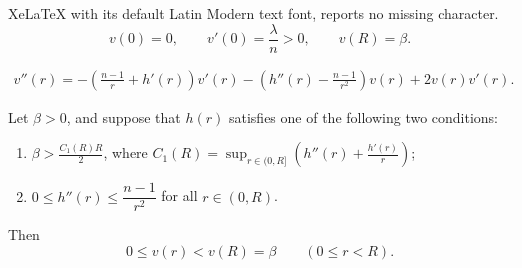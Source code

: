 \documentclass[10pt,a4paper]{amsart}
\begin{document}
XeLaTeX with its default Latin Modern text font, reports no missing character.
\begin{equation}\label{eq:v-origin}
	v(0)=0,\qquad v'(0)=\frac{\lambda}{n}>0,\qquad v(R)=\beta.
\end{equation}

\begin{align}\label{v second derivative}
    v''(r) = -\left(\frac{n-1}{r}+h'(r)\right)v'(r) - \left(h''(r)-\frac{n-1}{r^{2}}\right)v(r) + 2v(r)v'(r).
\end{align}

\begin{prop}\label{prop:Euclidean_v_max}
Let $\beta > 0$, and suppose that $h(r)$ satisfies one of the following two conditions: 
\begin{enumerate}
    \item[\textup{(i)}] $\beta > \frac{C_{1}(R)R}{2}$, where $C_{1}(R)=\sup_{r\in (0,R]} \left(h''(r) + \frac{h'(r)}{r}\right)$;
    \item[\textup{(ii)}] $0\leq h''(r)\leq \dfrac{n-1}{r^2}$ for all $r\in(0,R)$.
\end{enumerate}
Then
\begin{equation}\label{eq:v-Euclidean-bound}
	0\leq v(r)<v(R)=\beta
	\qquad(0\leq r<R).
\end{equation}
\end{prop}
\end{document}

